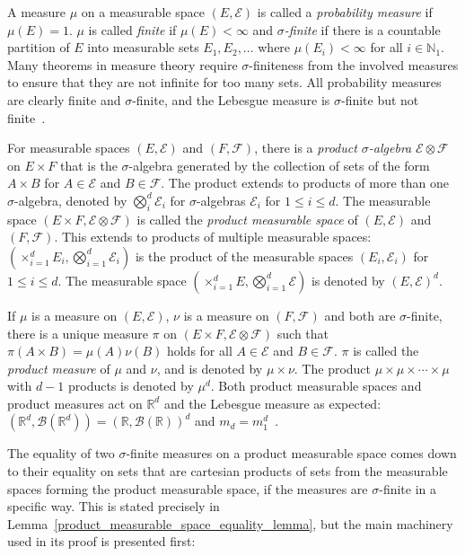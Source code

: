 \documentclass[english,twoside,openright]{HYgraduMLDS}
\newcommand{\R}{\mathbb{R}}
\newcommand{\N}{\mathbb{N}}
\DeclareMathOperator*{\bigtimes}{\times}
\begin{document}
A measure \(\mu\) on a measurable space \((E, \mathcal{E})\) is called
a \emph{probability measure} if \(\mu(E) = 1\). \(\mu\) is called \emph{finite}
if \(\mu(E) < \infty\) and
\emph{\(\sigma\)-finite} if there is a countable partition of \(E\)
into measurable sets \(E_{1}, E_{2},\dotsc\) where \(\mu(E_{i}) < \infty\)
for all \(i\in \N_{1}\).
Many theorems in measure theory require \(\sigma\)-finiteness from the involved
measures to ensure that they are not infinite for too many sets.
All probability measures are clearly finite and \(\sigma\)-finite,
and the Lebesgue measure is \(\sigma\)-finite but not finite~\cite{Cin11}.

For measurable spaces \((E, \mathcal{E})\) and \((F, \mathcal{F})\),
there is a \emph{product \(\sigma\)-algebra} \(\mathcal{E}\otimes \mathcal{F}\)
on \(E\times F\) that is the \(\sigma\)-algebra generated
by the collection of sets of the form \(A\times B\) for \(A\in \mathcal{E}\) and
\(B\in\mathcal{F}\). The product extends to products of more than one
\(\sigma\)-algebra, denoted by \(\bigotimes_{i}^{d}\mathcal{E}_{i}\) for
\(\sigma\)-algebras \(\mathcal{E}_{i}\) for \(1\leq i \leq d\).
The measurable space \((E\times F, \mathcal{E}\otimes \mathcal{F})\) is called
the \emph{product measurable space} of \((E, \mathcal{E})\) and \((F, \mathcal{F})\).
This extends to products of multiple measurable spaces:
\((\bigtimes_{i=1}^{d}E_{i}, \bigotimes_{i=1}^{d}\mathcal{E}_{i})\) is the
product of the measurable spaces \((E_{i}, \mathcal{E}_{i})\) for
\(1\leq i \leq d\).
The measurable space \((\bigtimes_{i=1}^{d}E, \bigotimes_{i=1}^{d}\mathcal{E})\)
is denoted by \((E, \mathcal{E})^{d}\).

If \(\mu\) is a measure on
\((E, \mathcal{E})\), \(\nu\) is a measure on \((F, \mathcal{F})\) and both
are \(\sigma\)-finite, there is a unique measure \(\pi\) on
\((E\times F, \mathcal{E}\otimes \mathcal{F})\) such that
\(\pi(A\times B) = \mu(A)\nu(B)\) holds for all \(A\in \mathcal{E}\) and
\(B\in \mathcal{F}\)\cite{Cin11}. \(\pi\) is called the
\emph{product measure} of \(\mu\) and \(\nu\), and is denoted by \(\mu\times \nu\).
The product
\(\mu\times \mu\times \dotsb \times \mu\) with \(d - 1\) products is denoted by
\(\mu^{d}\). Both product measurable spaces and product measures act on
\(\R^{d}\) and the Lebesgue measure as expected:
\((\R^{d}, \mathcal{B}(\R^{d})) = (\R, \mathcal{B}(\R))^{d}\) and
\(m_{d} = m_{1}^{d}\)~\cite{Cin11}.

The equality of two \(\sigma\)-finite measures on a product measurable space
comes down to
their equality on sets that are cartesian products of sets from the measurable
spaces forming the product measurable space, if the measures are
\(\sigma\)-finite in a specific way. This is stated precisely in
Lemma~\ref{product_measurable_space_equality_lemma}, but the main machinery
used in its proof is presented first:
\end{document}
